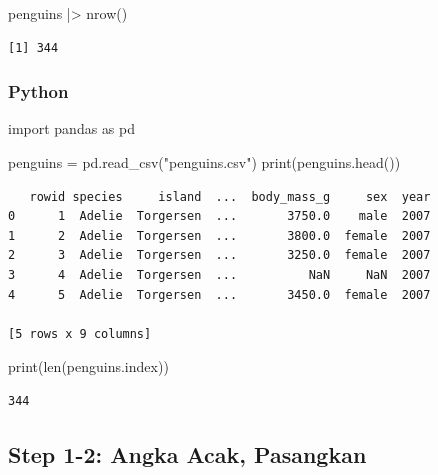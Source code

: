 \documentclass[
  letterpaper,
  DIV=11,
  numbers=noendperiod]{scrreprt}
\newenvironment{Shaded}{\begin{snugshade}}{\end{snugshade}}
\newcommand{\BuiltInTok}[1]{\textcolor[rgb]{0.00,0.23,0.31}{#1}}
\newcommand{\FunctionTok}[1]{\textcolor[rgb]{0.28,0.35,0.67}{#1}}
\newcommand{\ImportTok}[1]{\textcolor[rgb]{0.00,0.46,0.62}{#1}}
\newcommand{\NormalTok}[1]{\textcolor[rgb]{0.00,0.23,0.31}{#1}}
\newcommand{\OperatorTok}[1]{\textcolor[rgb]{0.37,0.37,0.37}{#1}}
\newcommand{\SpecialCharTok}[1]{\textcolor[rgb]{0.37,0.37,0.37}{#1}}
\newcommand{\StringTok}[1]{\textcolor[rgb]{0.13,0.47,0.30}{#1}}
\begin{document}
\begin{Shaded}
\begin{Highlighting}[]
\NormalTok{penguins }\SpecialCharTok{|\textgreater{}} \FunctionTok{nrow}\NormalTok{()}
\end{Highlighting}
\end{Shaded}

\begin{verbatim}
[1] 344
\end{verbatim}

\hypertarget{python-1}{%
\subsubsection{Python}\label{python-1}}

\begin{Shaded}
\begin{Highlighting}[]
\ImportTok{import}\NormalTok{ pandas }\ImportTok{as}\NormalTok{ pd}

\NormalTok{penguins }\OperatorTok{=}\NormalTok{ pd.read\_csv(}\StringTok{"penguins.csv"}\NormalTok{)}
\BuiltInTok{print}\NormalTok{(penguins.head())}
\end{Highlighting}
\end{Shaded}

\begin{verbatim}
   rowid species     island  ...  body_mass_g     sex  year
0      1  Adelie  Torgersen  ...       3750.0    male  2007
1      2  Adelie  Torgersen  ...       3800.0  female  2007
2      3  Adelie  Torgersen  ...       3250.0  female  2007
3      4  Adelie  Torgersen  ...          NaN     NaN  2007
4      5  Adelie  Torgersen  ...       3450.0  female  2007

[5 rows x 9 columns]
\end{verbatim}

\begin{Shaded}
\begin{Highlighting}[]
\BuiltInTok{print}\NormalTok{(}\BuiltInTok{len}\NormalTok{(penguins.index))}
\end{Highlighting}
\end{Shaded}

\begin{verbatim}
344
\end{verbatim}

\hypertarget{step-1-2-angka-acak-pasangkan}{%
\subsection{Step 1-2: Angka Acak,
Pasangkan}\label{step-1-2-angka-acak-pasangkan}}
\end{document}
